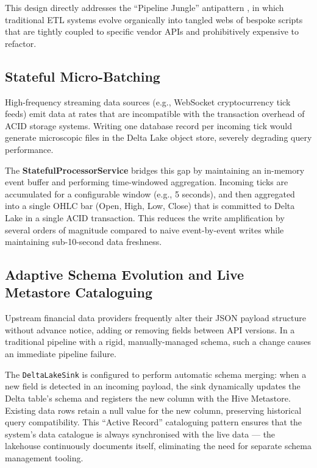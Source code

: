 \documentclass[12pt, a4paper]{report}
\begin{document}
This design directly addresses the ``Pipeline Jungle'' antipattern \citep{sculley2015hidden},
in which traditional ETL systems evolve organically into tangled webs of bespoke scripts
that are tightly coupled to specific vendor APIs and prohibitively expensive to refactor.

\subsection{Stateful Micro-Batching}
\label{ssec:microbatching}

High-frequency streaming data sources (e.g., WebSocket cryptocurrency tick feeds)
emit data at rates that are incompatible with the transaction overhead of ACID storage
systems.
Writing one database record per incoming tick would generate microscopic files in the
Delta Lake object store, severely degrading query performance.

The \textbf{StatefulProcessorService} bridges this gap by maintaining an in-memory
event buffer and performing time-windowed aggregation.
Incoming ticks are accumulated for a configurable window (e.g., 5 seconds), and then
aggregated into a single OHLC bar (Open, High, Low, Close) that is committed to Delta
Lake in a single ACID transaction.
This reduces the write amplification by several orders of magnitude compared to naive
event-by-event writes while maintaining sub-10-second data freshness.

\subsection{Adaptive Schema Evolution and Live Metastore Cataloguing}
\label{ssec:schema_evolution}

Upstream financial data providers frequently alter their JSON payload structure without
advance notice, adding or removing fields between API versions.
In a traditional pipeline with a rigid, manually-managed schema, such a change causes an
immediate pipeline failure.

The \texttt{DeltaLakeSink} is configured to perform automatic schema merging:
when a new field is detected in an incoming payload, the sink dynamically updates the
Delta table's schema and registers the new column with the Hive Metastore.
Existing data rows retain a null value for the new column, preserving historical query
compatibility.
This ``Active Record'' cataloguing pattern ensures that the system's data catalogue is
always synchronised with the live data — the lakehouse continuously documents itself,
eliminating the need for separate schema management tooling.
\end{document}
